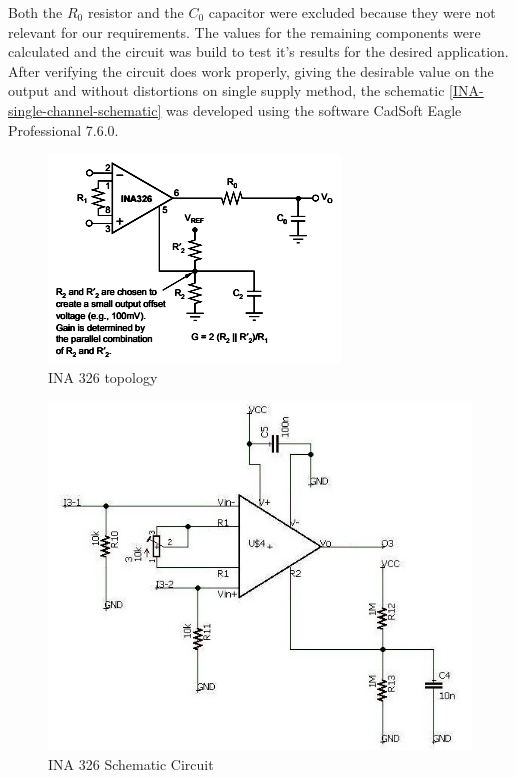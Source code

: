 Both the $R_0$ resistor and the $C_0$ capacitor were excluded because they were not
relevant for our requirements. The values for the remaining components were calculated
and the circuit was build to test it's results for the desired application.
After verifying the circuit does work properly, giving the desirable value on the output and without
distortions on single supply method, the schematic \autoref{INA-single-channel-schematic} was
developed using the software CadSoft Eagle Professional 7.6.0.
\begin{figure}[!htpb]
  \centering
  \caption{INA 326 topology}
  \label{INA_topology}
  \includegraphics[scale=0.7]{images/INA/datasheet}
\end{figure}

\begin{figure}[!htpb]
  \centering
  \caption{INA 326 Schematic Circuit}
  \label{INA-single-channel-schematic}
  \includegraphics[scale=0.65]{images/INA/single-channel-schematic}
\end{figure}


